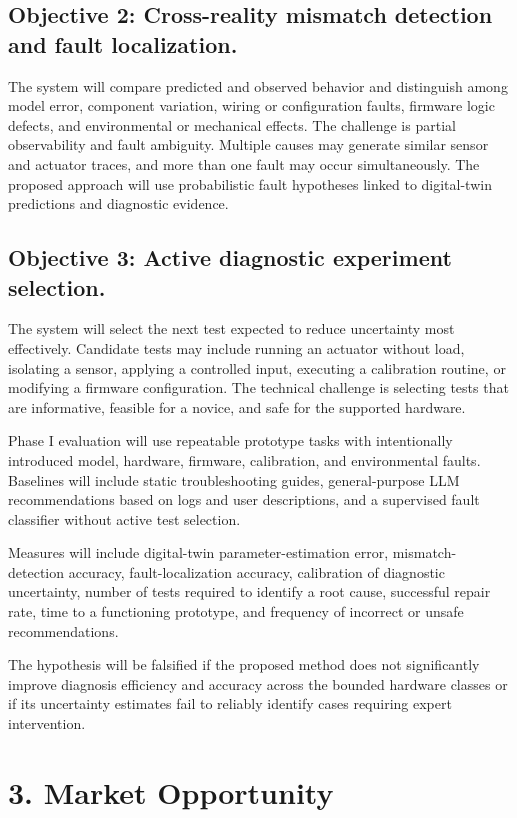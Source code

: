 \subsection{Objective 2: Cross-reality mismatch detection and fault localization.}
The system will compare predicted and observed behavior and distinguish among model error, component variation, wiring or configuration faults, firmware logic defects, and environmental or mechanical effects. The challenge is partial observability and fault ambiguity. Multiple causes may generate similar sensor and actuator traces, and more than one fault may occur simultaneously. The proposed approach will use probabilistic fault hypotheses linked to digital-twin predictions and diagnostic evidence.

\subsection{Objective 3: Active diagnostic experiment selection.}
The system will select the next test expected to reduce uncertainty most effectively. Candidate tests may include running an actuator without load, isolating a sensor, applying a controlled input, executing a calibration routine, or modifying a firmware configuration. The technical challenge is selecting tests that are informative, feasible for a novice, and safe for the supported hardware.

Phase I evaluation will use repeatable prototype tasks with intentionally introduced model, hardware, firmware, calibration, and environmental faults. Baselines will include static troubleshooting guides, general-purpose LLM recommendations based on logs and user descriptions, and a supervised fault classifier without active test selection.

Measures will include digital-twin parameter-estimation error, mismatch-detection accuracy, fault-localization accuracy, calibration of diagnostic uncertainty, number of tests required to identify a root cause, successful repair rate, time to a functioning prototype, and frequency of incorrect or unsafe recommendations.

The hypothesis will be falsified if the proposed method does not significantly improve diagnosis efficiency and accuracy across the bounded hardware classes or if its uncertainty estimates fail to reliably identify cases requiring expert intervention.

\section{3. Market Opportunity}


